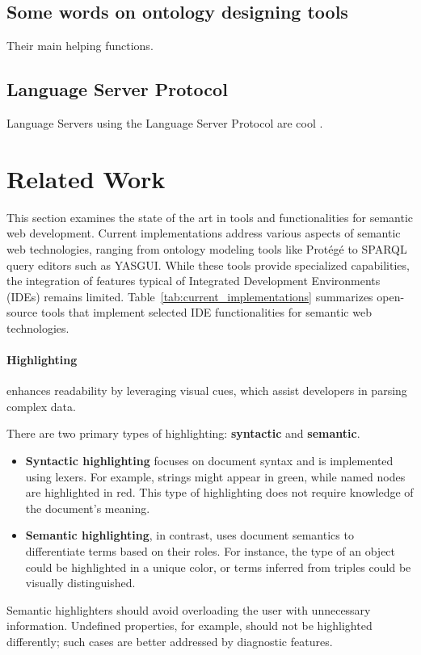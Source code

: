 \subsection*{Some words on ontology designing tools}
Their main helping functions\cite{ComparingOntologyBuildingTools}.

\subsection{Language Server Protocol}

Language Servers using the Language Server Protocol\cite{IntroToLsp} 
are cool \cite{GLSPFlexibility}.




\section{Related Work}%
\label{sec:related_work}

This section examines the state of the art in tools and functionalities for semantic web development. 
Current implementations address various aspects of semantic web technologies, ranging from ontology modeling tools like Protégé to SPARQL query editors such as YASGUI.
While these tools provide specialized capabilities, the integration of features typical of Integrated Development Environments (IDEs) remains limited. 
Table~\ref{tab:current_implementations} summarizes open-source tools that implement selected IDE functionalities for semantic web technologies.

\paragraph*{Highlighting} enhances readability by leveraging visual cues, which assist developers in parsing complex data. 

There are two primary types of highlighting: \textbf{syntactic} and \textbf{semantic}.
\begin{itemize}
    \item \textbf{Syntactic highlighting} focuses on document syntax and is implemented using lexers. For example, strings might appear in green, while named nodes are highlighted in red. This type of highlighting does not require knowledge of the document’s meaning.
    \item \textbf{Semantic highlighting}, in contrast, uses document semantics to differentiate terms based on their roles. For instance, the type of an object could be highlighted in a unique color, or terms inferred from triples could be visually distinguished.
\end{itemize}
Semantic highlighters should avoid overloading the user with unnecessary information. Undefined properties, for example, should not be highlighted differently; such cases are better addressed by diagnostic features.


